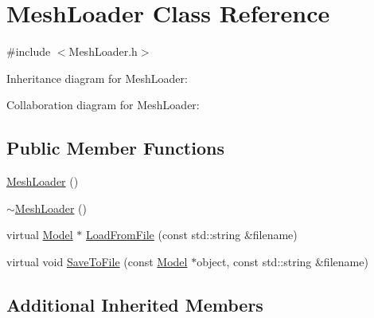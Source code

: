 \hypertarget{class_mesh_loader}{\section{Mesh\+Loader Class Reference}
\label{class_mesh_loader}
}


{\ttfamily \#include $<$Mesh\+Loader.\+h$>$}



Inheritance diagram for Mesh\+Loader\+:


Collaboration diagram for Mesh\+Loader\+:
\subsection*{Public Member Functions}
\begin{DoxyCompactItemize}
\item 
\hyperlink{class_mesh_loader_a3dfe18053d07cfe24f6e55cd610658b8}{Mesh\+Loader} ()
\item 
\hyperlink{class_mesh_loader_a4cfe76415e6ec9db3895450e043b77ff}{$\sim$\+Mesh\+Loader} ()
\item 
virtual \hyperlink{class_agmd_1_1_model}{Model} $\ast$ \hyperlink{class_mesh_loader_a895bf275dc410e869d1616243847d60f}{Load\+From\+File} (const std\+::string \&filename)
\item 
virtual void \hyperlink{class_mesh_loader_abab08be2eb32b87f978b6773baba8182}{Save\+To\+File} (const \hyperlink{class_agmd_1_1_model}{Model} $\ast$object, const std\+::string \&filename)
\end{DoxyCompactItemize}
\subsection*{Additional Inherited Members}


